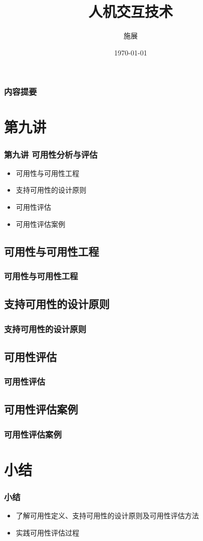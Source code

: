 \documentclass{beamer}
\title{人机交互技术}
\author{施展}
\institute{华中科技大学~武汉光电国家实验室}
\date{\today}
\begin{document}
\begin{frame}
	\frametitle{内容提要}
	\titlepage
\end{frame}

\begin{frame}
	\tableofcontents
\end{frame}

\section{第九讲}
\begin{frame}
	\frametitle{第九讲 可用性分析与评估}
	\begin{itemize}
		\item 可用性与可用性工程
		\item 支持可用性的设计原则
		\item 可用性评估
		\item 可用性评估案例
	\end{itemize}
\end{frame}

\subsection{可用性与可用性工程}
\begin{frame}
	\frametitle{可用性与可用性工程}

\end{frame}

\subsection{支持可用性的设计原则}
\begin{frame}
	\frametitle{支持可用性的设计原则}

\end{frame}

\subsection{可用性评估}
\begin{frame}
	\frametitle{可用性评估}

\end{frame}

\subsection{可用性评估案例}
\begin{frame}
	\frametitle{可用性评估案例}

\end{frame}

\section{小结}
\begin{frame}
	\frametitle{小结}
	\begin{itemize}
		\item 了解可用性定义、支持可用性的设计原则及可用性评估方法
		\item 实践可用性评估过程
	\end{itemize}
\end{frame}
\end{document}
